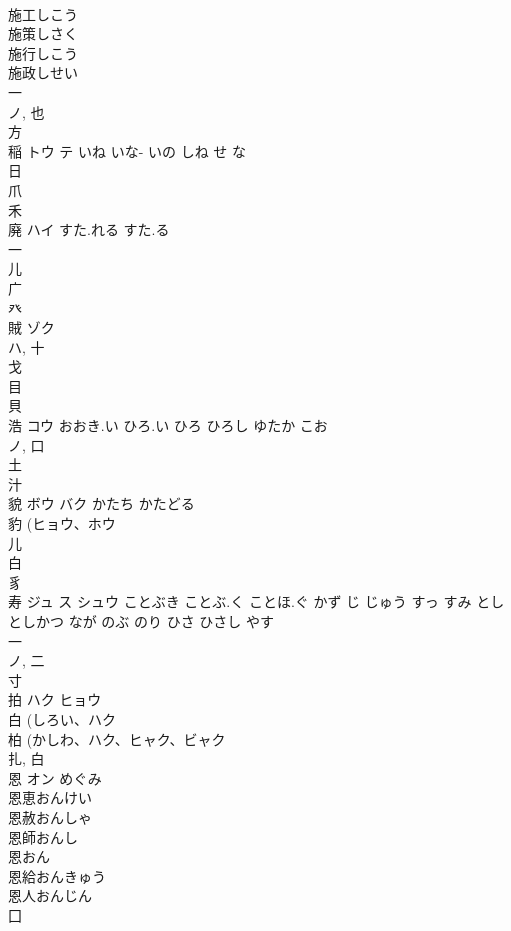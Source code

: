 \documentclass[8pt]{extreport}
\begin{document}
\begin{CJK}{UTF8}{min}
\\	施工しこう 
\\	施策しさく 
\\	施行しこう 
\\	施政しせい 
\\	一 
\\	ノ, 也 
\\	方 
\\	稲	トウ テ	いね いな- いの しね せ な	
\\	日 
\\	爪 
\\	禾 
\\	廃	ハイ	すた.れる すた.る	
\\	一 
\\	儿 
\\	广 
\\	癶 
\\	賊	ゾク		
\\	ハ, 十 
\\	戈 
\\	目 
\\	貝 
\\	浩	コウ	おおき.い ひろ.い ひろ ひろし ゆたか こお	
\\	ノ, 口 
\\	土 
\\	汁 
\\	貌	ボウ バク	かたち かたどる	
\\	豹 (ヒョウ、ホウ 
\\	儿 
\\	白 
\\	豸 
\\	寿	ジュ ス シュウ	ことぶき ことぶ.く ことほ.ぐ かず じ じゅう すっ すみ とし としかつ なが のぶ のり ひさ ひさし やす	
\\	一 
\\	ノ, 二 
\\	寸 
\\	拍	ハク ヒョウ		
\\	白 (しろい、ハク 
\\	柏 (かしわ、ハク、ヒャク、ビャク 
\\	扎, 白 
\\	恩	オン	めぐみ	
\\	恩恵おんけい 
\\	恩赦おんしゃ 
\\	恩師おんし 
\\	恩おん 
\\	恩給おんきゅう 
\\	恩人おんじん 
\\	囗 

\end{CJK}
\end{document}
